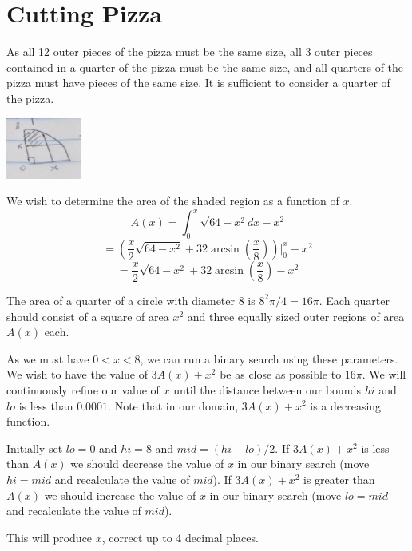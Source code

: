 \documentclass{article}
\begin{document}
\section{Cutting Pizza}
As all 12 outer pieces of the pizza must be the same size, all 3 outer pieces contained in a quarter of the pizza must be the same size, and all quarters of the pizza must have pieces of the same size. It is sufficient to consider a quarter of the pizza.
\par
\includegraphics{pizzadiagram}
\par
We wish to determine the area of the shaded region as a function of $x$.
\[A(x)=\int^x_0{\sqrt{64-x^2}dx}-x^2\]
\[=(\frac{x}{2}\sqrt{64-x^2}+32\arcsin(\frac{x}{8}))| ^x_0 -x^2\]
\[=\frac{x}{2}\sqrt{64-x^2}+32\arcsin(\frac{x}{8}) -x^2\]
\par 
The area of a quarter of a circle with diameter 8 is $8^2\pi/4=16\pi$. Each quarter should consist of a square of area $x^2$ and three equally sized outer regions of area $A(x)$ each.
\par 
As we must have $0 < x <8$, we can run a binary search using these parameters. We wish to have the value of $3A(x)+x^2$ be as close as possible to $16\pi$. We will continuously refine our value of $x$ until the distance between our bounds $hi$ and $lo$ is less than $0.0001$. Note that in our domain, $3A(x)+x^2$ is a decreasing function.
\par 
Initially set $lo=0$ and $hi=8$ and $mid=(hi-lo)/2$. If $3A(x)+x^2$ is less than $A(x)$ we should decrease the value of $x$ in our binary search (move $hi=mid$ and recalculate the value of $mid$).  If $3A(x)+x^2$ is greater than $A(x)$ we should increase the value of $x$ in our binary search (move $lo=mid$ and recalculate the value of $mid$). 
\par 
This will produce $x$, correct up to 4 decimal places.
\end{document}
